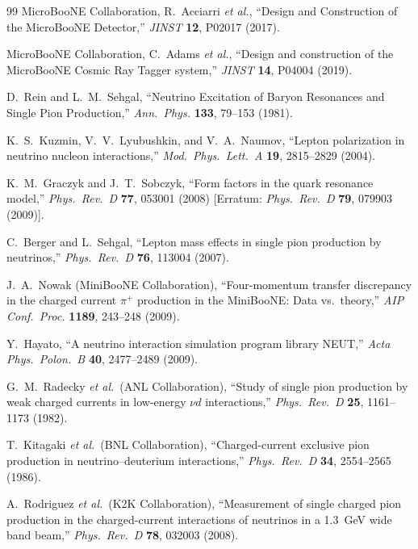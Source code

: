 \begin{thebibliography}{99}
  MicroBooNE Collaboration, R.~Acciarri \textit{et al.},
  ``Design and Construction of the MicroBooNE Detector,''
  \textit{JINST} \textbf{12}, P02017 (2017).

  MicroBooNE Collaboration, C.~Adams \textit{et al.},
  ``Design and construction of the MicroBooNE Cosmic Ray Tagger system,''
  \textit{JINST} \textbf{14}, P04004 (2019).

  D.~Rein and L.~M.~Sehgal,
  ``Neutrino Excitation of Baryon Resonances and Single Pion Production,''
  \textit{Ann.\ Phys.} \textbf{133}, 79--153 (1981).

  K.~S.~Kuzmin, V.~V.~Lyubushkin, and V.~A.~Naumov,
  ``Lepton polarization in neutrino nucleon interactions,''
  \textit{Mod.\ Phys.\ Lett.\ A} \textbf{19}, 2815--2829 (2004).

  K.~M.~Graczyk and J.~T.~Sobczyk,
  ``Form factors in the quark resonance model,''
  \textit{Phys.\ Rev.\ D} \textbf{77}, 053001 (2008)
  [Erratum: \textit{Phys.\ Rev.\ D} \textbf{79}, 079903 (2009)].

  C.~Berger and L.~Sehgal,
  ``Lepton mass effects in single pion production by neutrinos,''
  \textit{Phys.\ Rev.\ D} \textbf{76}, 113004 (2007).

  J.~A.~Nowak (MiniBooNE Collaboration),
  ``Four-momentum transfer discrepancy in the charged current $\pi^+$ production
  in the MiniBooNE: Data vs.\ theory,''
  \textit{AIP Conf.\ Proc.} \textbf{1189}, 243--248 (2009).

  Y.~Hayato,
  ``A neutrino interaction simulation program library NEUT,''
  \textit{Acta Phys.\ Polon.\ B} \textbf{40}, 2477--2489 (2009).

  G.~M.~Radecky \textit{et al.}\ (ANL Collaboration),
  ``Study of single pion production by weak charged currents in low-energy
  $\nu d$ interactions,''
  \textit{Phys.\ Rev.\ D} \textbf{25}, 1161--1173 (1982).

  T.~Kitagaki \textit{et al.}\ (BNL Collaboration),
  ``Charged-current exclusive pion production in neutrino--deuterium
  interactions,''
  \textit{Phys.\ Rev.\ D} \textbf{34}, 2554--2565 (1986).

  A.~Rodriguez \textit{et al.}\ (K2K Collaboration),
  ``Measurement of single charged pion production in the charged-current
  interactions of neutrinos in a 1.3~GeV wide band beam,''
  \textit{Phys.\ Rev.\ D} \textbf{78}, 032003 (2008).


\end{thebibliography}
